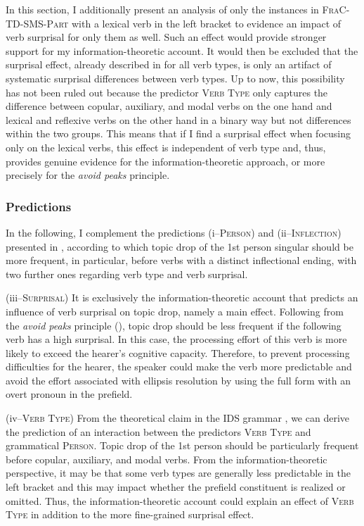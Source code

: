 In this section, I additionally present an analysis of only the instances in \textsc{FraC-TD-SMS-Part} with a lexical verb in the left bracket to evidence an impact of verb surprisal for only them as well.
Such an effect would provide stronger support for my information-theoretic account.
It would then be excluded that the surprisal effect, already described in  for all verb types, is only an artifact of systematic surprisal differences between verb types.
Up to now, this possibility has not been ruled out because the predictor \textsc{Verb Type} only captures the difference between copular, auxiliary, and modal verbs on the one hand and lexical and reflexive verbs on the other hand in a binary way but not differences within the two groups.
This means that if I find a surprisal effect when focusing  only on the lexical verbs, this effect is independent of verb type and, thus, provides genuine evidence for the information-theoretic approach, or more precisely for the \textit{avoid peaks} principle.

\subsubsection{Predictions}\label{sec:corpus.regression.predictions.rep}
In the following, I complement the predictions (i--\textsc{Person}) and (ii--\textsc{Inflection}) presented in , according to which topic drop of the 1st person singular should be more frequent, in particular, before verbs with a distinct inflectional ending,  with two further ones regarding verb type and verb surprisal.

(iii--\textsc{Surprisal}) 
It is exclusively the information-theoretic account that predicts an influence of verb surprisal on topic drop, namely a main effect.
Following from the \textit{avoid peaks} principle (), topic drop should be less frequent if the following verb has a high surprisal.
In this case, the processing effort  of this verb is more likely to exceed the hearer's cognitive capacity. 
Therefore, to prevent processing difficulties for the hearer, the speaker could  make the verb more predictable  and avoid the effort  associated with ellipsis resolution by using the full form with an overt pronoun in the prefield.

(iv--\textsc{Verb Type})
From the theoretical claim in the IDS grammar \citep[415]{zifonun.etal1997}, we can derive the prediction of an interaction between the predictors \textsc{Verb Type} and grammatical \textsc{Person}.
Topic drop of the 1st person should be particularly frequent before copular, auxiliary, and modal verbs.
From the information-theoretic perspective, it may be that some verb types are generally less predictable  in the left bracket and this may impact whether the prefield constituent is realized or omitted.
Thus, the information-theoretic account could explain an effect of \textsc{Verb Type} in addition to the more fine-grained surprisal effect.

